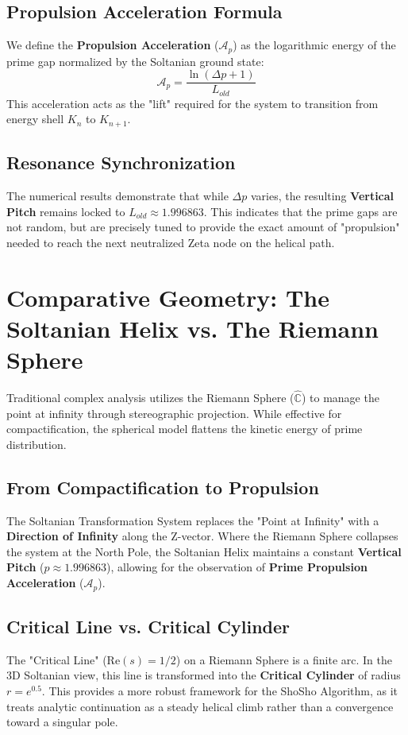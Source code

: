 \documentclass[11pt,a4paper]{article}
\begin{document}
\subsection{Propulsion Acceleration Formula}
We define the \textbf{Propulsion Acceleration} ($\mathcal{A}_p$) as the logarithmic energy of the prime gap normalized by the Soltanian ground state:
\begin{equation}
    \mathcal{A}_p = \frac{\ln(\Delta p + 1)}{L_{old}}
\end{equation}
This acceleration acts as the "lift" required for the system to transition from energy shell $K_n$ to $K_{n+1}$. 

\subsection{Resonance Synchronization}
The numerical results demonstrate that while $\Delta p$ varies, the resulting \textbf{Vertical Pitch} remains locked to $L_{old} \approx 1.996863$. This indicates that the prime gaps are not random, but are precisely tuned to provide the exact amount of "propulsion" needed to reach the next neutralized Zeta node on the helical path.

\section{Comparative Geometry: The Soltanian Helix vs. The Riemann Sphere}

Traditional complex analysis utilizes the Riemann Sphere ($\hat{\mathbb{C}}$) to manage the point at infinity through stereographic projection. While effective for compactification, the spherical model flattens the kinetic energy of prime distribution. 

\subsection{From Compactification to Propulsion}
The Soltanian Transformation System replaces the "Point at Infinity" with a \textbf{Direction of Infinity} along the Z-vector. Where the Riemann Sphere collapses the system at the North Pole, the Soltanian Helix maintains a constant \textbf{Vertical Pitch} ($p \approx 1.996863$), allowing for the observation of \textbf{Prime Propulsion Acceleration} ($\mathcal{A}_p$).

\subsection{Critical Line vs. Critical Cylinder}
The "Critical Line" ($\text{Re}(s) = 1/2$) on a Riemann Sphere is a finite arc. In the 3D Soltanian view, this line is transformed into the \textbf{Critical Cylinder} of radius $r = e^{0.5}$. This provides a more robust framework for the ShoSho Algorithm, as it treats analytic continuation as a steady helical climb rather than a convergence toward a singular pole.
\end{document}
